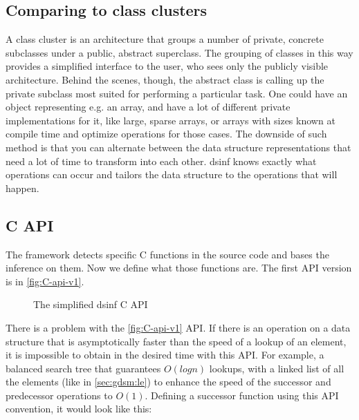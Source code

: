 \documentclass[a4paper,11pt]{article}
\begin{document}
	\subsection{Comparing to class clusters} \label{sub:classcluster}
		A class cluster is an architecture that groups a number of private, concrete subclasses under a public,
		abstract superclass. The grouping of classes in this way provides a simplified interface to the user,
		who sees only the publicly visible architecture. Behind the scenes, though, the abstract class is
		calling up the private subclass most suited for performing a particular task\cite{AppleCC}. One could
		have an object representing e.g. an array, and have a lot of different private implementations for it, like
		large, sparse arrays, or arrays with sizes known at compile time and optimize operations for those
		cases. The downside of such method is that you can alternate between the data structure representations
		that need a lot of time to transform into each other. dsinf knows exactly what operations can occur and
		tailors the data structure to the operations that will happen.

	\subsection{C API}
        The framework detects specific C functions in the source code and bases the inference on them. Now we define
        what those functions are. The first API version is in \autoref{fig:C-api-v1}.

        \begin{figure}[h!]
            

            \caption{The simplified dsinf C API}

            \label{fig:C-api-v1}
        \end{figure}

        There is a problem with the \autoref{fig:C-api-v1} API. If there is an
        operation on a data structure that is asymptotically faster than the
        speed of a lookup of an element, it is impossible to obtain in the
        desired time with this API. For example, a balanced search tree
        that guarantees $O(log n)$ lookups, with a linked list of all the
        elements (like in \autoref{sec:gdsm:le}) to enhance the speed of the
        successor and predecessor operations to $O(1)$. Defining a successor
        function using this API convention, it would look like this:
\end{document}
